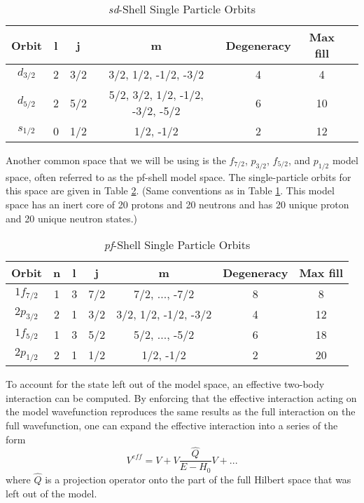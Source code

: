 \begin{table}
    \caption{\textit{sd}-Shell Single Particle Orbits}
    \label{table: sd.spo}
\begin{tabular}
    {c c c c c c c}
    \hline 
    \hline
Orbit & l & j & m & Degeneracy & Max fill  \\
    \hline
$d_{3/2}$      & 2 & 3/2  & 3/2, 1/2, -1/2, -3/2            & 4  & 4   \\
$d_{5/2}$      & 2 & 5/2  & 5/2, 3/2, 1/2, -1/2, -3/2, -5/2 & 6  & 10  \\
$s_{1/2}$      & 0 & 1/2  & 1/2, -1/2                       & 2  & 12  \\
    \hline
    \hline
\end{tabular}

\end{table} 

Another common space that we will be using is the $f_{7/2}$, $p_{3/2}$, $f_{5/2}$, and $p_{1/2}$ model space, 
often referred to as the pf-shell model space. The single-particle orbits 
for this space are given in Table \ref{table: fp.spo}. (Same conventions as in Table
\ref{table: sd.spo}. This model space has an inert core of 20 protons and 20 neutrons
and has 20 unique proton and 20 unique neutron states.)

\begin{table}
    \caption{\textit{pf}-Shell Single Particle Orbits }
    \label{table: fp.spo}
\begin{tabular}
    {c c c c c c c}
    \hline 
    \hline
Orbit & n & l & j & m & Degeneracy & Max fill  \\
    \hline
$1f_{7/2}$    & 1  & 3 & 7/2  & 7/2, ..., -7/2      & 8  & 8   \\
$2p_{3/2}$    & 2  & 1 & 3/2  & 3/2, 1/2, -1/2, -3/2& 4  & 12  \\
$1f_{5/2}$    & 1  & 3 & 5/2  & 5/2, ..., -5/2      & 6  & 18  \\
$2p_{1/2}$    & 2  & 1 & 1/2  & 1/2, -1/2           & 2  & 20    \\
    \hline
    \hline
\end{tabular}
\end{table} 

To account for the state left out of the model space,  
an effective two-body interaction can be computed. By enforcing that the 
effective interaction acting on the model wavefunction reproduces the same
results as the full interaction on the full wavefunction, one can 
expand the effective interaction into a series of the form\cite{Heyde}
\begin{equation}\label{eff}
    V^{eff} = V + V\frac{\hat{Q}}{E - H_0}V + ...
\end{equation}
where $\hat{Q}$ is a projection operator onto the part of the full Hilbert space
that was left out of the model. 

